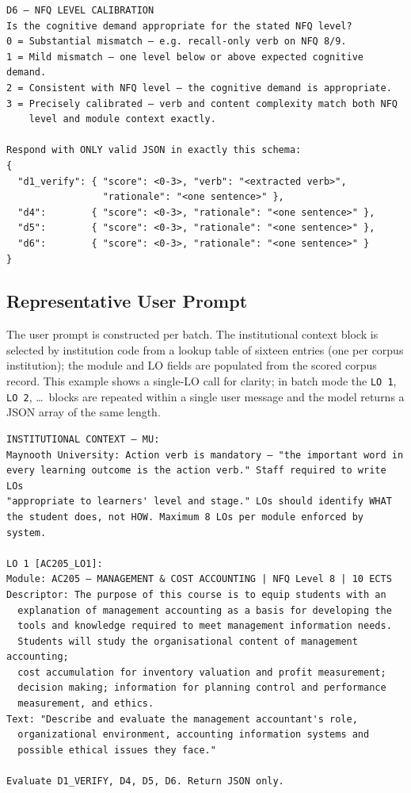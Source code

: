 \documentclass[12pt, a4paper]{article}
\begin{document}
\begin{small}
\begin{verbatim}
D6 — NFQ LEVEL CALIBRATION
Is the cognitive demand appropriate for the stated NFQ level?
0 = Substantial mismatch — e.g. recall-only verb on NFQ 8/9.
1 = Mild mismatch — one level below or above expected cognitive demand.
2 = Consistent with NFQ level — the cognitive demand is appropriate.
3 = Precisely calibrated — verb and content complexity match both NFQ
    level and module context exactly.

Respond with ONLY valid JSON in exactly this schema:
{
  "d1_verify": { "score": <0-3>, "verb": "<extracted verb>",
                 "rationale": "<one sentence>" },
  "d4":        { "score": <0-3>, "rationale": "<one sentence>" },
  "d5":        { "score": <0-3>, "rationale": "<one sentence>" },
  "d6":        { "score": <0-3>, "rationale": "<one sentence>" }
}
\end{verbatim}
\end{small}

\subsection{Representative User Prompt}
\label{app:user-prompt}

The user prompt is constructed per batch. The institutional context block is
selected by institution code from a lookup table of sixteen entries (one per
corpus institution); the module and LO fields are populated from the scored
corpus record. This example shows a single-LO call for clarity; in batch mode
the \texttt{LO~1}, \texttt{LO~2}, \ldots\ blocks are repeated within a single
user message and the model returns a JSON array of the same length.

\begin{small}
\begin{verbatim}
INSTITUTIONAL CONTEXT — MU:
Maynooth University: Action verb is mandatory — "the important word in
every learning outcome is the action verb." Staff required to write LOs
"appropriate to learners' level and stage." LOs should identify WHAT
the student does, not HOW. Maximum 8 LOs per module enforced by system.

LO 1 [AC205_LO1]:
Module: AC205 — MANAGEMENT & COST ACCOUNTING | NFQ Level 8 | 10 ECTS
Descriptor: The purpose of this course is to equip students with an
  explanation of management accounting as a basis for developing the
  tools and knowledge required to meet management information needs.
  Students will study the organisational content of management accounting;
  cost accumulation for inventory valuation and profit measurement;
  decision making; information for planning control and performance
  measurement, and ethics.
Text: "Describe and evaluate the management accountant's role,
  organizational environment, accounting information systems and
  possible ethical issues they face."

Evaluate D1_VERIFY, D4, D5, D6. Return JSON only.
\end{verbatim}
\end{small}
\end{document}
